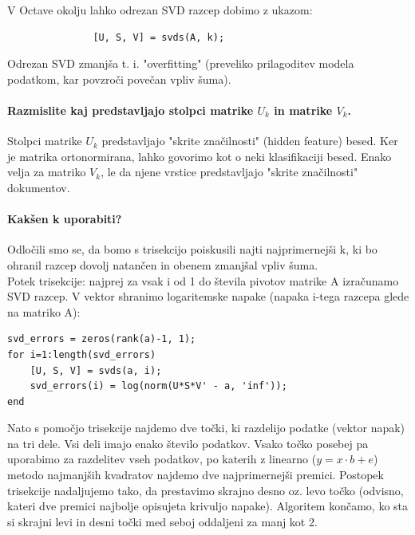\documentclass{article}
\begin{document}
V Octave okolju lahko odrezan SVD razcep dobimo z ukazom:

\begin{lstlisting}
               [U, S, V] = svds(A, k);
\end{lstlisting}
Odrezan SVD zmanjša t. i. "overfitting" (preveliko prilagoditev modela podatkom, kar povzroči povečan vpliv šuma).

\paragraph{Razmislite kaj predstavljajo stolpci matrike \( U_{k} \) in matrike \( V_{k} \).}
Stolpci matrike \( U_{k} \) predstavljajo "skrite značilnosti" (hidden feature) besed. Ker je matrika ortonormirana, lahko govorimo kot o neki klasifikaciji besed.
Enako velja za matriko  \( V_{k} \), le da njene vrstice predstavljajo "skrite značilnosti" dokumentov.

\paragraph{Kakšen k uporabiti?}
Odločili smo se, da bomo s trisekcijo poiskusili najti najprimernejši k, ki bo ohranil razcep dovolj natančen in obenem zmanjšal vpliv šuma. 
\pagebreak \\
Potek trisekcije: najprej za vsak i od 1 do števila pivotov matrike A izračunamo SVD razcep. V vektor shranimo logaritemske napake (napaka i-tega razcepa glede na matriko A):

\begin{lstlisting}
svd_errors = zeros(rank(a)-1, 1);
for i=1:length(svd_errors)
	[U, S, V] = svds(a, i);
	svd_errors(i) = log(norm(U*S*V' - a, 'inf'));
end
\end{lstlisting}

Nato s pomočjo trisekcije najdemo dve točki, ki razdelijo podatke (vektor napak) na tri dele. Vsi deli imajo enako število podatkov. Vsako točko posebej pa uporabimo za razdelitev vseh podatkov, po katerih z linearno (\( y = x\cdot b + e \)) metodo najmanjših kvadratov najdemo dve najprimernejši premici. Postopek trisekcije nadaljujemo tako, da prestavimo skrajno desno oz. levo točko (odvisno, kateri dve premici najbolje opisujeta krivuljo napake). Algoritem končamo, ko sta si skrajni levi in desni točki med seboj oddaljeni za manj kot 2. \\ 
\end{document}
